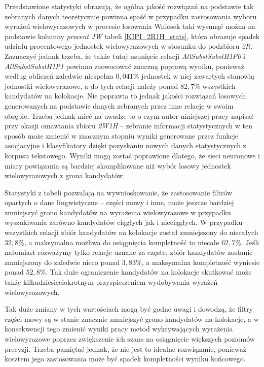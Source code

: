 \documentclass[11pt,a4paper]{llncs}
\begin{document}
\par
Przedstawione statystyki obrazują, że ogólna jakość rozwiązań na podstawie tak zebranych danych teoretycznie powinna spaść w przypadku zastosowania wyboru wyrażeń wielowyrazowych w procesie losowania
Wniosek taki wysunąć można na podstawie kolumny \emph{procent JW} tabeli \ref{KIPI_2R1H_stats}, która obrazuje spadek udziału procentowego jednostek wielowyrazowych w stosunku do podzbioru \emph{2R}.
Zaznaczyć jednak trzeba, że także tutaj usunięcie relacji \emph{AllSubstSubstH1P0} i \emph{AllSubstSubstH1P1} powinno zaowocować znaczną poprawą wyniku, ponieważ według obliczeń zaledwie niespełna $ 0,041\% $ jednostek w niej zawartych stanowią jednostki wielowyrazowe, a do tych relacji należy ponad $ 82,7\% $ wszystkich kandydatów na kolokacje.
Nie poprawia to jednak jakości rozwiązań losowych generowanych na podstawie danych zebranych przez inne relacje w swoim obrębie.
Trzeba jednak mieć na uwadze to o czym autor niniejszej pracy napisał przy okazji omawiania zbioru \emph{2W1H} -- zebranie informacji statystycznych w ten sposób może zmienić w znacznym stopniu wyniki generowane przez funkcje asocjacyjne i klasyfikatory dzięki pozyskaniu nowych danych statystycznych z korpusu tekstowego.
Wyniki mogą zostać poprawione dlatego, że sieci neuronowe i miary powiązania są bardziej skomplikowane niż wybór losowy jednostek wielowyrazowych z grona kandydatów.

\par
Statystyki z tabeli pozwalają na wywnioskowanie, że zastosowanie filtrów opartych o dane lingwistyczne -- części mowy i inne, może jeszcze bardziej zmniejszyć grono kandydatów na wyrażenia wielowyrazowe w przypadku wyszukiwania zarówno kandydatów ciągłych jak i nieciągłych.
W przypadku wszystkich relacji zbiór kandydatów na kolokacje został zmniejszony do niecałych $ 32,8\% $, a maksymalna możliwa do osiągnięcia kompletność to niecałe $ 62,7\% $.
Jeśli natomiast rozważymy tylko relacje uznane za częste, zbiór kandydatów zostanie zmniejszony do zaledwie nieco ponad $ 3,83\% $, a maksymalna kompletność wyniesie ponad $ 52,8\% $.
Tak duże ograniczenie kandydatów na kolokacje skutkować może także kilkudziesięciokrotnym przyspieszeniem wydobywania wyrażeń wielowyrazowych.

\par
Tak duże zmiany w tych wartościach mogą być godne uwagi i dowodzą, że filtry części mowy są w stanie znacznie zmniejszyć grono kandydatów na kolokacje, a w konsekwencji tego zmienić wyniki pracy metod wykrywających wyrażenia wielowyrazowe poprzez zwiększenie ich szans na osiągnięcie większych poziomów precyzji.
Trzeba pamiętać jednak, że nie jest to idealne rozwiązanie, ponieważ kosztem jego zastosowania może być spadek kompletności wyniku końcowego.
\end{document}
